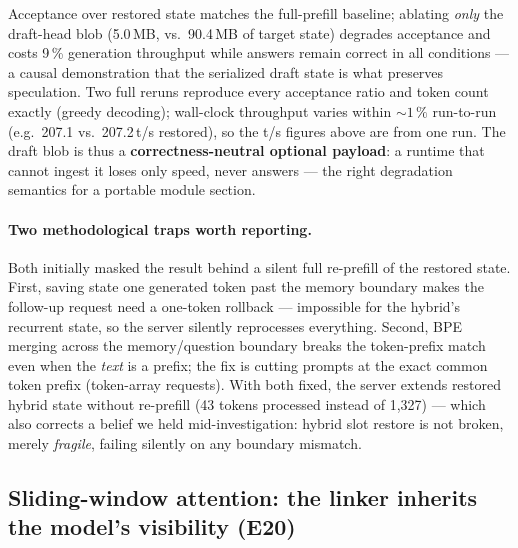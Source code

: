 \documentclass[11pt]{article}
\begin{document}
Acceptance over restored state matches the full-prefill baseline; ablating \emph{only} the draft-head blob (5.0\,MB, vs.\ 90.4\,MB of target state) degrades acceptance and costs 9\,\% generation throughput while answers remain correct in all conditions --- a causal demonstration that the serialized draft state is what preserves speculation. Two full reruns reproduce every acceptance ratio and token count exactly (greedy decoding); wall-clock throughput varies within ${\sim}1\,\%$ run-to-run (e.g.\ 207.1 vs.\ 207.2\,t/s restored), so the t/s figures above are from one run. The draft blob is thus a \textbf{correctness-neutral optional payload}: a runtime that cannot ingest it loses only speed, never answers --- the right degradation semantics for a portable module section.

\paragraph{Two methodological traps worth reporting.}
Both initially masked the result behind a silent full re-prefill of the restored state. First, saving state one generated token past the memory boundary makes the follow-up request need a one-token rollback --- impossible for the hybrid's recurrent state, so the server silently reprocesses everything. Second, BPE merging across the memory/question boundary breaks the token-prefix match even when the \emph{text} is a prefix; the fix is cutting prompts at the exact common token prefix (token-array requests). With both fixed, the server extends restored hybrid state without re-prefill (43 tokens processed instead of 1{,}327) --- which also corrects a belief we held mid-investigation: hybrid slot restore is not broken, merely \emph{fragile}, failing silently on any boundary mismatch.

\subsection{Sliding-window attention: the linker inherits the model's visibility (E20)}
\label{sec:swa}
\end{document}
